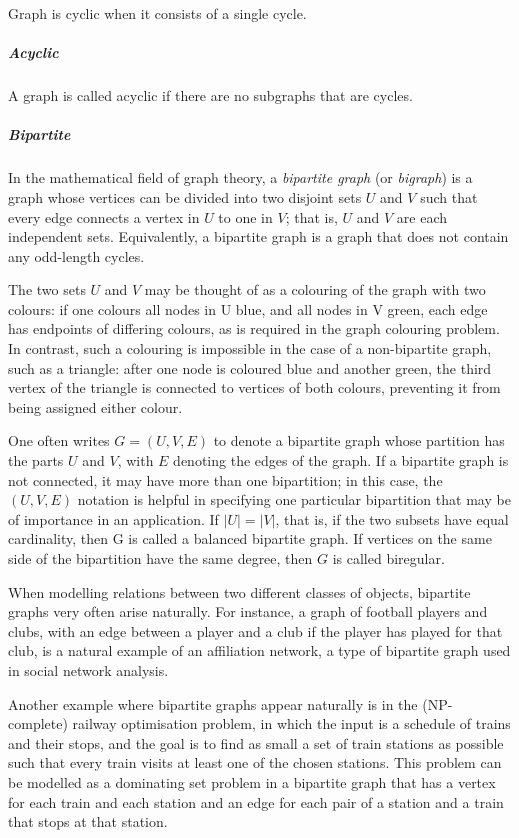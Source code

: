           Graph is cyclic when it consists of a single cycle.
          
        \subparagraph{Acyclic}
        
          A graph is called acyclic if there are no subgraphs that are cycles.

        \subparagraph{Bipartite}
        
          In the mathematical field of graph theory, a \emph{bipartite graph} (or \emph{bigraph}) is a graph whose vertices can be divided into two disjoint sets $U$ and $V$ such that every edge connects a vertex in $U$ to one in $V$; that is, $U$ and $V$ are each independent sets. Equivalently, a bipartite graph is a graph that does not contain any odd-length cycles\cite{Diestel2012,AsratianDenleyHaggkvist}.

          The two sets $U$ and $V$ may be thought of as a colouring of the graph with two colours: if one colours all nodes in U blue, and all nodes in V green, each edge has endpoints of differing colours, as is required in the graph colouring problem\cite{AsratianDenleyHaggkvist,Scheinerman2012}. In contrast, such a colouring is impossible in the case of a non-bipartite graph, such as a triangle: after one node is coloured blue and another green, the third vertex of the triangle is connected to vertices of both colours, preventing it from being assigned either colour.
          
          One often writes $G=(U,V,E)$ to denote a bipartite graph whose partition has the parts $U$ and $V$, with $E$ denoting the edges of the graph. If a bipartite graph is not connected, it may have more than one bipartition;\cite{ChartrandZhang2008} in this case, the $(U,V,E)$ notation is helpful in specifying one particular bipartition that may be of importance in an application. If $|U|=|V|$, that is, if the two subsets have equal cardinality, then G is called a balanced bipartite graph\cite{AsratianDenleyHaggkvist}. If vertices on the same side of the bipartition have the same degree, then $G$ is called biregular.
          
          When modelling relations between two different classes of objects, bipartite graphs very often arise naturally. For instance, a graph of football players and clubs, with an edge between a player and a club if the player has played for that club, is a natural example of an affiliation network, a type of bipartite graph used in social network analysis\cite{WassermanFaust1994}.

          Another example where bipartite graphs appear naturally is in the (NP-complete) railway optimisation problem, in which the input is a schedule of trains and their stops, and the goal is to find as small a set of train stations as possible such that every train visits at least one of the chosen stations. This problem can be modelled as a dominating set problem in a bipartite graph that has a vertex for each train and each station and an edge for each pair of a station and a train that stops at that station\cite{Niedermeier2006}.

